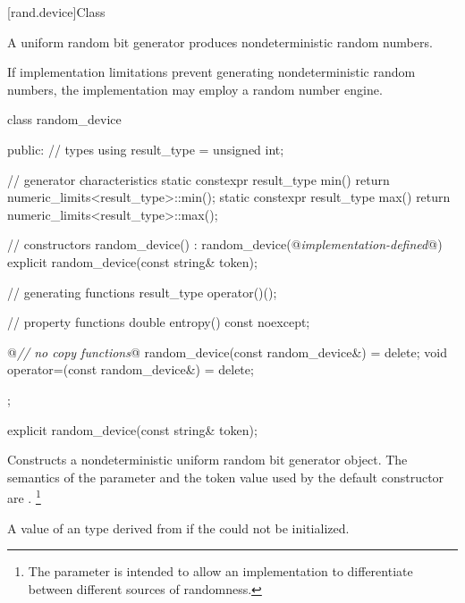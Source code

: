 

[rand.device]{Class }%
%

\pnum
A 
uniform random bit generator
produces nondeterministic random numbers.

\pnum
If implementation limitations%
prevent generating nondeterministic random numbers,
the implementation may employ a random number engine.

%
\begin{codeblock}
class random_device {
public:
  // types
  using result_type = unsigned int;

  // generator characteristics
  static constexpr result_type min() { return numeric_limits<result_type>::min(); }
  static constexpr result_type max() { return numeric_limits<result_type>::max(); }

  // constructors
  random_device() : random_device(@\textit{implementation-defined}@) {}
  explicit random_device(const string& token);

  // generating functions
  result_type operator()();

  // property functions
  double entropy() const noexcept;

  @\textit{// no copy functions}@
  random_device(const random_device&) = delete;
  void operator=(const random_device&) = delete;
};
\end{codeblock}


%
\begin{itemdecl}
explicit random_device(const string& token);
\end{itemdecl}

\begin{itemdescr}
\pnum\effects Constructs a 
 nondeterministic uniform random bit generator object.
 The semantics of the  parameter
 and the token value used by the default constructor are
 .%
\footnote{The parameter is intended
   to allow an implementation to differentiate
   between different sources of randomness.
 }

\pnum
\throws A value of an  type
 derived from 
 if the  could not be initialized.
\end{itemdescr}

